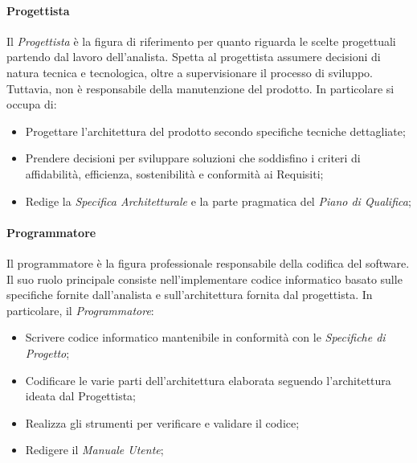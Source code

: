 \documentclass{article}
\begin{document}
\paragraph{Progettista}\label{progettista}Il \textit{Progettista} è la figura di riferimento per quanto riguarda le scelte progettuali partendo dal lavoro dell'analista. Spetta al progettista assumere decisioni di natura tecnica e tecnologica, oltre a supervisionare il processo di sviluppo. Tuttavia, non è responsabile della manutenzione del prodotto. In particolare si occupa di:
\begin{itemize}
    \item Progettare l'architettura del prodotto secondo specifiche tecniche dettagliate;
    \item Prendere decisioni per sviluppare soluzioni che soddisfino i criteri di affidabilità, efficienza, sostenibilità e conformità ai Requisiti;
    \item Redige la \textit{Specifica Architetturale} e la parte pragmatica del \textit{Piano di Qualifica};
\end{itemize}
\paragraph{Programmatore}\label{programmatore}Il programmatore è la figura professionale responsabile della codifica del software. Il suo ruolo principale consiste nell'implementare codice informatico basato sulle specifiche fornite dall'analista e sull'architettura fornita dal progettista. In particolare, il \textit{Programmatore}:
\begin{itemize}
    \item Scrivere codice informatico mantenibile in conformità con le \textit{Specifiche di Progetto};
    \item Codificare le varie parti dell'architettura elaborata seguendo l'architettura ideata dal Progettista;
    \item Realizza gli strumenti per verificare e validare il codice;
    \item Redigere il \textit{Manuale Utente};
\end{itemize}
\end{document}
